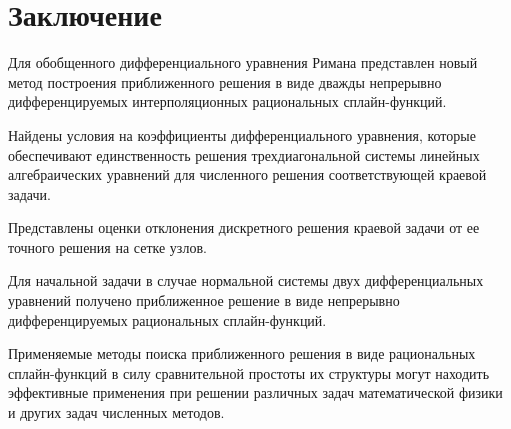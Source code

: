 \section{Заключение}

Для обобщенного дифференциального уравнения Римана представлен новый метод 
построения приближенного решения в виде дважды непрерывно
дифференцируемых интерполяционных рациональных сплайн-функций. 

Найдены условия на коэффициенты дифференциального уравнения, которые обеспечивают
единственность решения трехдиагональной системы линейных алгебраических уравнений
для численного решения соответствующей краевой задачи. 

Представлены оценки отклонения дискретного решения краевой задачи от ее точного 
решения на сетке узлов. 

Для начальной задачи в случае нормальной системы двух дифференциальных уравнений 
получено  приближенное решение в виде непрерывно дифференцируемых рациональных 
сплайн-функций. 

Применяемые методы поиска приближенного решения в виде рациональных сплайн-функций 
в силу сравнительной простоты их структуры могут находить эффективные применения
при решении различных задач математической физики и других задач численных методов.



%

%

%

%

% 
%
% 
%






















